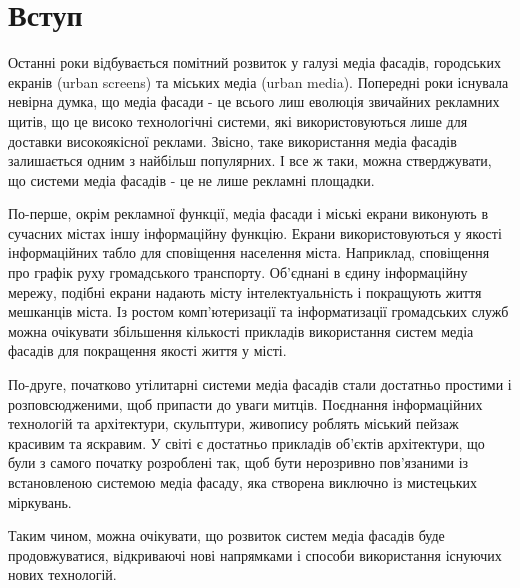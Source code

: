 \documentclass[a4paper,ukrainian,utf8,nocolumnsxix,floatsection,equationsection]{eskdtext}
\let\stdsection\section
\renewcommand\section{\clearpage\stdsection}
\newcommand{\sectionnonum}[1]{\section*{#1}\addcontentsline{toc}{section}{#1}}
\begin{document}


{}






\tableofcontents


\sectionnonum{Вступ}
\label{sec:intro}

Останні роки відбувається помітний розвиток у галузі медіа фасадів, городських екранів (urban screens) та міських медіа (urban media). Попередні роки існувала невірна думка, що медіа фасади - це всього лиш еволюція звичайних рекламних щитів, що це високо технологічні системи, які використовуються лише для доставки високоякісної реклами. Звісно, таке використання медіа фасадів залишається одним з найбільш популярних. І все ж таки, можна стверджувати, що системи медіа фасадів - це не лише рекламні площадки. 

По-перше, окрім рекламної функції, медіа фасади і міські екрани виконують в сучасних містах іншу інформаційну функцію. Екрани використовуються у якості інформаційних табло для сповіщення населення міста. Наприклад, сповіщення про графік руху громадського транспорту. Об’єднані в єдину інформаційну мережу, подібні екрани надають місту інтелектуальність і покращують життя мешканців міста. Із ростом комп’ютеризації та інформатизації громадських служб можна очікувати збільшення кількості прикладів використання систем медіа фасадів для покращення якості життя у місті.

По-друге, початково утілитарні системи медіа фасадів стали достатньо простими і розповсюдженими, щоб припасти до уваги митців. Поєднання інформаційних технологій та архітектури, скульптури, живопису роблять міський пейзаж красивим та яскравим. У світі є достатньо прикладів об’єктів архітектури, що були з самого початку розроблені так, щоб бути нерозривно пов’язаними із встановленою системою медіа фасаду, яка створена виключно із мистецьких міркувань. 

Таким чином, можна очікувати, що розвиток систем медіа фасадів буде продовжуватися, відкриваючі нові напрямками і способи використання існуючих нових технологій. 
\end{document}
